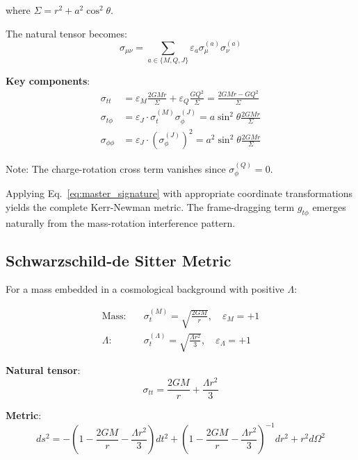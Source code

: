 \documentclass[11pt,a4paper]{article}
\theoremstyle{definition}
\theoremstyle{remark}
\begin{document}
	where $\Sigma = r^2 + a^2\cos^2\theta$.
	
	The natural tensor becomes:
	\begin{equation}
		\sigma_{\mu\nu} = \sum_{a \in \{M,Q,J\}} \varepsilon_a\sigma_\mu^{(a)}\sigma_\nu^{(a)}
	\end{equation}
	
	\textbf{Key components}:
	\begin{align}
		\sigma_{tt} &= \varepsilon_M\frac{2GMr}{\Sigma} + \varepsilon_Q\frac{GQ^2}{\Sigma} = \frac{2GMr - GQ^2}{\Sigma} \\
		\sigma_{t\phi} &= \varepsilon_J \cdot \sigma_t^{(M)}\sigma_\phi^{(J)} = a\sin^2\theta\frac{2GMr}{\Sigma} \\
		\sigma_{\phi\phi} &= \varepsilon_J \cdot (\sigma_\phi^{(J)})^2 = a^2\sin^2\theta\frac{2GMr}{\Sigma}
	\end{align}
	
	Note: The charge-rotation cross term vanishes since $\sigma_\phi^{(Q)} = 0$.
	
	Applying Eq.~\eqref{eq:master_signature} with appropriate coordinate transformations yields the complete Kerr-Newman metric. The frame-dragging term $g_{t\phi}$ emerges naturally from the mass-rotation interference pattern.
	
	\subsection{Schwarzschild-de Sitter Metric}
	
	For a mass embedded in a cosmological background with positive $\Lambda$:
	
	\begin{align}
		\text{Mass:} \quad & \sigma_t^{(M)} = \sqrt{\frac{2GM}{r}}, \quad \varepsilon_M = +1 \\
		\text{$\Lambda$:} \quad & \sigma_t^{(\Lambda)} = \sqrt{\frac{\Lambda r^2}{3}}, \quad \varepsilon_\Lambda = +1
	\end{align}
	
	\textbf{Natural tensor}:
	\begin{equation}
		\sigma_{tt} = \frac{2GM}{r} + \frac{\Lambda r^2}{3}
	\end{equation}
	
	\textbf{Metric}:
	\begin{equation}
		\boxed{ds^2 = -\left(1 - \frac{2GM}{r} - \frac{\Lambda r^2}{3}\right)dt^2 + \left(1 - \frac{2GM}{r} - \frac{\Lambda r^2}{3}\right)^{-1}dr^2 + r^2d\Omega^2}
	\end{equation}
	
\end{document}
